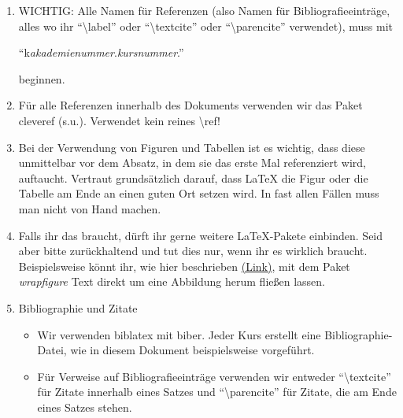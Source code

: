 \documentclass{dsadokumentation}
\begin{document}
\begin{enumerate}
	\item WICHTIG: Alle Namen für Referenzen (also Namen für Bibliografieeinträge, alles wo ihr \enquote{\textbackslash label} oder \enquote{\textbackslash textcite} oder \enquote{\textbackslash parencite} verwendet), muss mit \begin{center} \enquote{k\textit{akademienummer}.\textit{kursnummer}.} \end{center} beginnen.

	\item Für alle Referenzen innerhalb des Dokuments verwenden wir das Paket cleveref (s.u.). Verwendet kein reines \textbackslash ref!
	\item Bei der Verwendung von Figuren und Tabellen ist es wichtig, dass diese unmittelbar vor dem Absatz, in dem sie das erste Mal referenziert wird, auftaucht. Vertraut grundsätzlich darauf, dass \LaTeX{} die Figur oder die Tabelle am Ende an einen guten Ort setzen wird. In fast allen Fällen muss man nicht von Hand machen.
  \item Falls ihr das braucht, dürft ihr gerne weitere \LaTeX{}-Pakete einbinden. Seid aber bitte zurückhaltend und tut dies nur, wenn ihr es wirklich braucht.
		Beispielsweise könnt ihr, wie hier beschrieben \href{https://en.wikibooks.org/wiki/LaTeX/Floats,_Figures_and_Captions#Wrapping_text_around_figures}{(Link)}, mit dem Paket \emph{wrapfigure} Text direkt um eine Abbildung herum fließen lassen.
	\item Bibliographie und Zitate
	      \begin{itemize}
		      \item Wir verwenden biblatex mit biber. Jeder Kurs erstellt eine Bibliographie-Datei, wie in diesem Dokument beispielsweise vorgeführt.
		      \item Für Verweise auf Bibliografieeinträge verwenden wir entweder \enquote{\textbackslash textcite} für Zitate innerhalb eines Satzes und \enquote{\textbackslash parencite} für Zitate, die am Ende eines Satzes stehen.
	      \end{itemize}
\end{enumerate}
\end{document}
